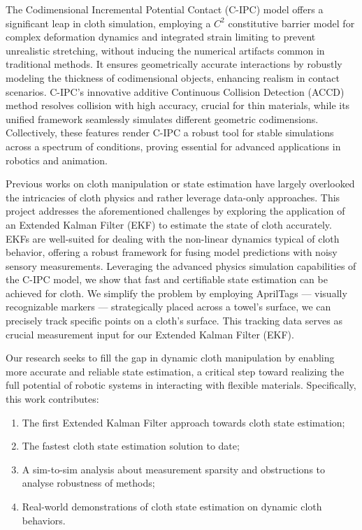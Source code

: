 The Codimensional Incremental Potential Contact (C-IPC) model offers a significant leap in cloth simulation, employing a $C^2$ constitutive barrier model for complex deformation dynamics and integrated strain limiting to prevent unrealistic stretching, without inducing the numerical artifacts common in traditional methods\cite{Li2020IPC, Li2021CIPC}. It ensures geometrically accurate interactions by robustly modeling the thickness of codimensional objects, enhancing realism in contact scenarios. C-IPC's innovative additive Continuous Collision Detection (ACCD) method resolves collision with high accuracy, crucial for thin materials, while its unified framework seamlessly simulates different geometric codimensions. Collectively, these features render C-IPC a robust tool for stable simulations across a spectrum of conditions, proving essential for advanced applications in robotics and animation. 

Previous works on cloth manipulation or state estimation have largely overlooked the intricacies of cloth physics and rather leverage data-only approaches\cite{clegg2018learning, chen2022efficiently, bertiche2022neural, santesteban2019learning, lahner2018deepwrinkles}. This project addresses the aforementioned challenges by exploring the application of an Extended Kalman Filter (EKF) to estimate the state of cloth accurately. EKFs are well-suited for dealing with the non-linear dynamics typical of cloth behavior, offering a robust framework for fusing model predictions with noisy sensory measurements. Leveraging the advanced physics simulation capabilities of the C-IPC model, we show that fast and certifiable state estimation can be achieved for cloth. We simplify the problem by employing AprilTags — visually recognizable markers — strategically placed across a towel's surface, we can precisely track specific points on a cloth's surface. This tracking data serves as crucial measurement input for our Extended Kalman Filter (EKF).

Our research seeks to fill the gap in dynamic cloth manipulation by enabling more accurate and reliable state estimation, a critical step toward realizing the full potential of robotic systems in interacting with flexible materials. Specifically, this work contributes:

\begin{enumerate}
    \item The first Extended Kalman Filter approach towards cloth state estimation;
    \item The fastest cloth state estimation solution to date;
    \item A sim-to-sim analysis about measurement sparsity and obstructions to analyse robustness of methods;
    \item Real-world demonstrations of cloth state estimation on dynamic cloth behaviors.
\end{enumerate}

